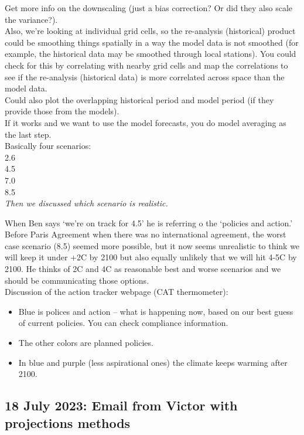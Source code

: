 \documentclass[11pt,letter]{article}
\begin{document}
Get more info on the downscaling (just a bias correction? Or did they also scale the variance?). \\

Also, we're looking at individual grid cells, so the re-analysis (historical) product could be smoothing things spatially in a way the model data is not smoothed (for example, the historical data may be smoothed through local stations). You could check for this by correlating with nearby grid cells and map the correlations to see if the re-analysis (historical data) is more correlated across space than the model data. \\

Could also plot the overlapping historical period and model period (if they provide those from the models). \\

If it works and we want to use the model forecasts, you do model averaging as the last step. \\

Basically four scenarios:\\
2.6\\
4.5\\
7.0\\
8.5\\

\emph{Then we discussed which scenario is realistic.} 

When Ben says `we're on track for 4.5' he is referring o the `policies and action.' Before Paris Agreement when there was no international agreement, the worst case scenario (8.5) seemed more possible, but it now seems unrealistic to think we will keep it under +2C by 2100 but also equally unlikely that we will hit 4-5C by 2100. He thinks of 2C and 4C as reasonable best and worse scenarios and we should be communicating those options. \\

Discussion of the action tracker webpage (CAT thermometer):
\begin{itemize}
	\item  Blue is polices and action -- what is happening now, based on our best guess of current policies. You can check compliance information. 
	\item The other colors are planned policies. 
	\item In blue and purple (less aspirational ones) the climate keeps warming after 2100.
\end{itemize}

\subsection{18 July 2023: Email from Victor with projections methods}
\end{document}
